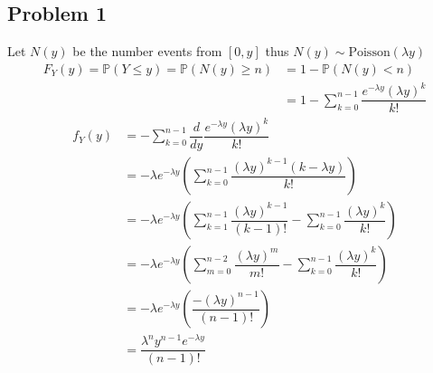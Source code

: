 \documentclass[12pt, letterpaper]{article}
\theoremstyle{definition}
\renewcommand{\P}{\mathbb{P}}
\renewcommand{\t}[1]{\text{#1}}
\begin{document}
\pagestyle{fancy}
\fancyhf{}
\fancyhead[ROE]{\thepage}

\subsection*{Problem 1}
Let $N(y)$ be the number events from $[0,y]$ thus $N(y) \sim \t{Poisson}(\lambda y)$\\
\begin{align*}
    F_Y(y)=\P(Y \leq y)= \P(N(y) \geq n)&=1-\P(N(y) < n)\\
                                        &=1-\sum_{k=0}^{n-1}\dfrac{e^{-\lambda y}(\lambda y)^k}{k!}
\end{align*}
\begin{align*}
    f_Y(y)&=-\sum_{k=0}^{n-1}\dfrac{d}{dy}\dfrac{e^{-\lambda y}(\lambda y)^k}{k!}\\
          &=-\lambda e^{-\lambda y}\left( \sum_{k=0}^{n-1}\dfrac{(\lambda y)^{k-1}(k-\lambda y)}{k!} \right)\\
          &=-\lambda e^{-\lambda y}\left(  \sum_{k=1}^{n-1}\dfrac{(\lambda y)^{k-1}}{(k-1)!} -\sum_{k=0}^{n-1}\dfrac{(\lambda y)^{k}}{k!}\right)\\
          &=-\lambda e^{-\lambda y}\left(  \sum_{m=0}^{n-2}\dfrac{(\lambda y)^{m}}{m!} -\sum_{k=0}^{n-1}\dfrac{(\lambda y)^{k}}{k!}\right)\\
          &=-\lambda e^{-\lambda y}\left(  \dfrac{-(\lambda y)^{n-1}}{(n-1)!}\right)\\
          &=\dfrac{\lambda^ny^{n-1}e^{-\lambda y}}{(n-1)!}
\end{align*}

\newpage
\end{document}
